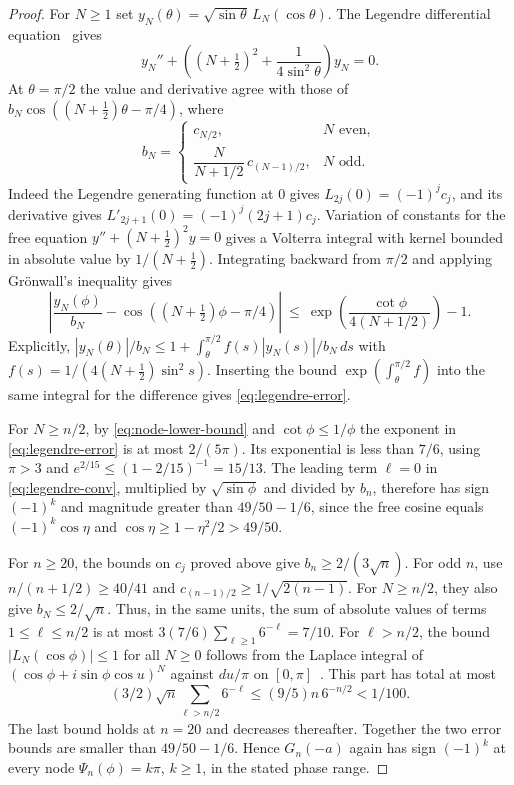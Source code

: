 \documentclass[11pt]{article}
\begin{document}
\begin{proof}
For $N\geq1$ set $y_N(\theta)=\sqrt{\sin\theta}\, L_N(\cos\theta)$. The Legendre differential equation~\cite[Table 18.8.1]{dlmf} gives
\[
y_N''+\left((N+\tfrac12)^2+\frac1{4\sin^2\theta}\right)y_N=0.
\]
At $\theta=\pi/2$ the value and derivative agree with those of
$b_N\cos((N+\tfrac12)\theta-\pi/4)$, where
\[
b_N=\begin{cases}
 c_{N/2},&N\text{ even},\\
 \dfrac{N}{N+1/2}\,c_{(N-1)/2},&N\text{ odd}.
\end{cases}
\]
Indeed the Legendre generating function at $0$ gives $L_{2j}(0)=(-1)^jc_j$, and its derivative gives $L'_{2j+1}(0)=(-1)^j(2j+1)c_j$. Variation of constants for the free equation $y''+(N+\tfrac12)^2y=0$ gives a Volterra integral with kernel bounded in absolute value by $1/(N+\tfrac12)$. Integrating backward from $\pi/2$ and applying Grönwall's inequality gives
\begin{equation}
\left|\frac{y_N(\phi)}{b_N}-
       \cos((N+\tfrac12)\phi-\pi/4)\right|
 \ \leq\ \exp\left(\frac{\cot\phi}{4(N+1/2)}\right)-1.
\label{eq:legendre-error}
\end{equation}
Explicitly, $|y_N(\theta)|/b_N\leq1+\int_\theta^{\pi/2} f(s)|y_N(s)|/b_N\,ds$ with $f(s)=1/(4(N+\tfrac12)\sin^2s)$. Inserting the bound $\exp(\int_\theta^{\pi/2}f)$ into the same integral for the difference gives \eqref{eq:legendre-error}.

For $N\geq n/2$, by \eqref{eq:node-lower-bound} and $\cot\phi\leq1/\phi$ the exponent in \eqref{eq:legendre-error} is at most $2/(5\pi)$. Its exponential is less than $7/6$, using $\pi>3$ and $e^{2/15}\leq(1-2/15)^{-1}=15/13$. The leading term $\ell=0$ in \eqref{eq:legendre-conv}, multiplied by $\sqrt{\sin\phi}$ and divided by $b_n$, therefore has sign $(-1)^k$ and magnitude greater than $49/50-1/6$, since the free cosine equals $(-1)^k\cos\eta$ and $\cos\eta\geq1-\eta^2/2>49/50$.

For $n\geq20$, the bounds on $c_j$ proved above give $b_n\geq 2/(3\sqrt n)$. For odd $n$, use $n/(n+1/2)\geq40/41$ and $c_{(n-1)/2}\geq1/\sqrt{2(n-1)}$. For $N\geq n/2$, they also give $b_N\leq2/\sqrt n$. Thus, in the same units, the sum of absolute values of terms $1\leq\ell\leq n/2$ is at most $3(7/6)\sum_{\ell\geq1}6^{-\ell}=7/10$. For $\ell>n/2$, the bound $|L_N(\cos\phi)|\leq1$ for all $N\geq0$ follows from the Laplace integral of $(\cos\phi+i\sin\phi\cos u)^N$ against $du/\pi$ on $[0,\pi]$~\cite[(18.10.5)]{dlmf}. This part has total at most
\[
(3/2)\sqrt n\sum_{\ell>n/2}6^{-\ell}
 \leq (9/5)n\,6^{-n/2}<1/100 .
\]
The last bound holds at $n=20$ and decreases thereafter. Together the two error bounds are smaller than $49/50-1/6$. Hence $G_n(-a)$ again has sign $(-1)^k$ at every node $\Psi_n(\phi)=k\pi$, $k\geq1$, in the stated phase range.
\end{proof}
\end{document}

